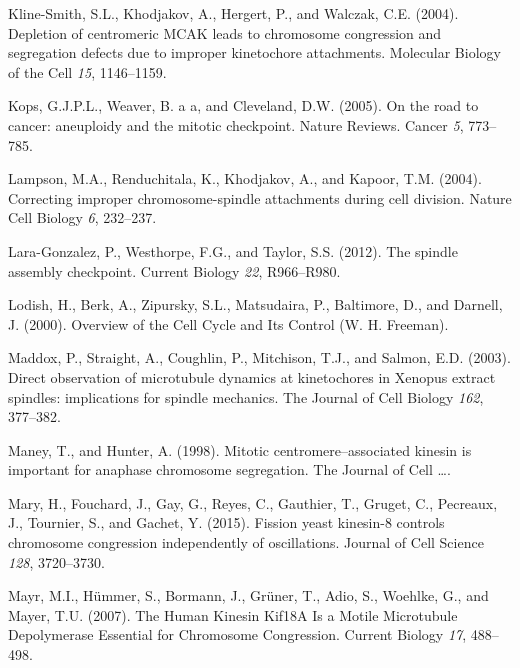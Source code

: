 \documentclass[12pt,a4paper,twoside,openright]{book}
\begin{document}
Kline-Smith, S.L., Khodjakov, A., Hergert, P., and Walczak, C.E. (2004).
Depletion of centromeric MCAK leads to chromosome congression and
segregation defects due to improper kinetochore attachments. Molecular
Biology of the Cell \emph{15}, 1146--1159.

Kops, G.J.P.L., Weaver, B. a a, and Cleveland, D.W. (2005). On the road
to cancer: aneuploidy and the mitotic checkpoint. Nature Reviews. Cancer
\emph{5}, 773--785.

Lampson, M.A., Renduchitala, K., Khodjakov, A., and Kapoor, T.M. (2004).
Correcting improper chromosome-spindle attachments during cell division.
Nature Cell Biology \emph{6}, 232--237.

Lara-Gonzalez, P., Westhorpe, F.G., and Taylor, S.S. (2012). The spindle
assembly checkpoint. Current Biology \emph{22}, R966--R980.

Lodish, H., Berk, A., Zipursky, S.L., Matsudaira, P., Baltimore, D., and
Darnell, J. (2000). Overview of the Cell Cycle and Its Control (W. H.
Freeman).

Maddox, P., Straight, A., Coughlin, P., Mitchison, T.J., and Salmon,
E.D. (2003). Direct observation of microtubule dynamics at kinetochores
in Xenopus extract spindles: implications for spindle mechanics. The
Journal of Cell Biology \emph{162}, 377--382.

Maney, T., and Hunter, A. (1998). Mitotic centromere--associated kinesin
is important for anaphase chromosome segregation. The Journal of Cell
\ldots{}.

Mary, H., Fouchard, J., Gay, G., Reyes, C., Gauthier, T., Gruget, C.,
Pecreaux, J., Tournier, S., and Gachet, Y. (2015). Fission yeast
kinesin-8 controls chromosome congression independently of oscillations.
Journal of Cell Science \emph{128}, 3720--3730.

Mayr, M.I., Hümmer, S., Bormann, J., Grüner, T., Adio, S., Woehlke, G.,
and Mayer, T.U. (2007). The Human Kinesin Kif18A Is a Motile Microtubule
Depolymerase Essential for Chromosome Congression. Current Biology
\emph{17}, 488--498.
\end{document}
